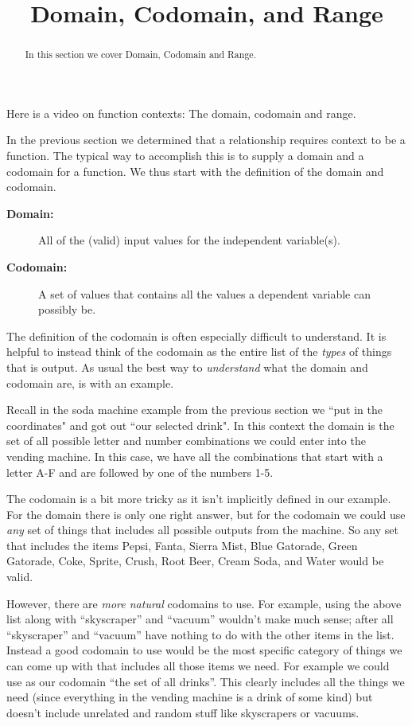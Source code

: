 \documentclass{ximera}
\title{Domain, Codomain, and Range}
\begin{document}
\begin{abstract}
    In this section we cover Domain, Codomain and Range.
\end{abstract}
\maketitle

Here is a video on function contexts: The domain, codomain and range.


In the previous section we determined that a relationship requires context to be a function. The typical way to accomplish this is to supply a domain and a codomain for a function. We thus start with the definition of the domain and codomain.

\begin{description}
    \item[\textbf{Domain:}] All of the (valid) input values for the independent variable(s).
    \item[\textbf{Codomain:}] A set of values that contains all the values a dependent variable can possibly be.
\end{description}

The definition of the codomain is often especially difficult to understand. It is helpful to instead think of the codomain as the entire list of the \textit{types} of things that is output. As usual the best way to \textit{understand} what the domain and codomain are, is with an example.

Recall in the soda machine example from the previous section we ``put in the coordinates" and got out ``our selected drink". In this context the domain is the set of all possible letter and number combinations we could enter into the vending machine. In this case, we have all the combinations that start with a letter A-F and are followed by one of the numbers 1-5.

The codomain is a bit more tricky as it isn't implicitly defined in our example. For the domain there is only one right answer, but for the codomain we could use \textit{any} set of things that includes all possible outputs from the machine. So any set that includes the items Pepsi, Fanta, Sierra Mist, Blue Gatorade, Green Gatorade, Coke, Sprite, Crush, Root Beer, Cream Soda, and Water would be valid.

However, there are \textit{more natural} codomains to use. For example, using the above list along with ``skyscraper'' and ``vacuum'' wouldn't make much sense; after all ``skyscraper'' and ``vacuum'' have nothing to do with the other items in the list. Instead a good codomain to use would be the most specific category of things we can come up with that includes all those items we need. For example we could use as our codomain ``the set of all drinks''. This clearly includes all the things we need (since everything in the vending machine is a drink of some kind) but doesn't include unrelated and random stuff like skyscrapers or vacuums.
\end{document}
